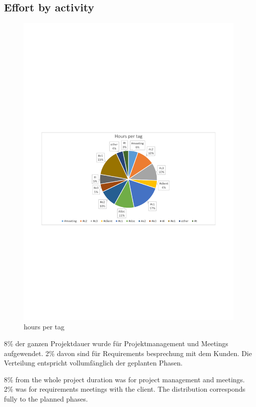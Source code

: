\subsection{Effort by activity}
\begin{figure}[]
	\includegraphics[trim=4cm 9.6cm 3.5cm 11.1cm, clip=true, width=\textwidth]{img/project_monitoring_hours_per_tag_diagram.pdf}
	\caption{hours per tag}
	\label{fig:hours:per:tag}
\end{figure}

8\% der ganzen Projektdauer wurde für Projektmanagement
und Meetings aufgewendet. 2\% davon sind für Requirements besprechung mit dem Kunden. Die Verteilung
entspricht vollumfänglich der geplanten Phasen. 

8\% from the whole project duration was for project management and meetings. 2\% was for requirements meetings with the client.
The distribution corresponds fully to the planned phases.
